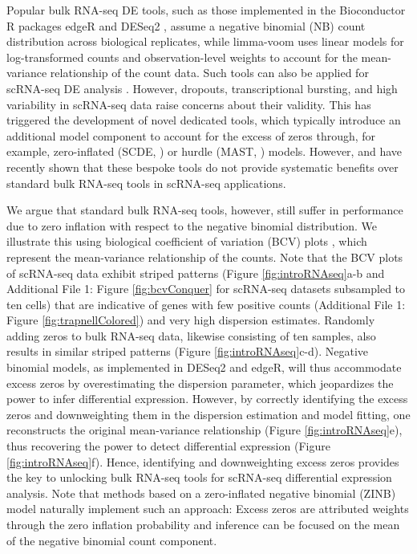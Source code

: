 \documentclass{bmcart}
\newcommand{\RPack}[1]{\textsf{#1}}
\begin{document}
Popular bulk RNA-seq DE tools, such as those implemented in the Bioconductor R packages \RPack{edgeR} \citep{Robinson2010a} and \RPack{DESeq2} \citep{Love2014}, assume a negative binomial (NB) count distribution across biological replicates, while limma-voom \citep{Law2014} uses linear models for log-transformed counts and observation-level weights to account for the mean-variance relationship of the count data. Such tools can also be applied for scRNA-seq DE analysis \citep{Lun2016}. However, dropouts, transcriptional bursting, and high variability in scRNA-seq data raise concerns about their validity. This has triggered the development of novel dedicated tools, which typically introduce an additional model component to account for the excess of zeros through, for example, zero-inflated (\RPack{SCDE}, \citet{Kharchenko2014}) or hurdle (\RPack{MAST}, \citet{Finak2015}) models. However, \citet{Jaakkola2016} and \citet{Soneson2017} have recently shown that these bespoke tools do not provide systematic benefits over standard bulk RNA-seq tools in scRNA-seq applications.

We argue that standard bulk RNA-seq tools, however, still suffer in performance due to zero inflation with respect to the negative binomial distribution. We illustrate this using biological coefficient of variation (BCV) plots \citep{McCarthy2012}, which represent the mean-variance relationship of the counts.
Note that the BCV plots of scRNA-seq data exhibit striped patterns (Figure \ref{fig:introRNAseq}a-b and Additional File 1: Figure \ref{fig:bcvConquer} for scRNA-seq datasets subsampled to ten cells) that are indicative of genes with few positive counts (Additional File 1: Figure \ref{fig:trapnellColored}) and very high dispersion estimates. Randomly adding zeros to bulk RNA-seq data, likewise consisting of ten samples, also results in 
similar striped patterns (Figure \ref{fig:introRNAseq}c-d). Negative binomial models, as implemented in \RPack{DESeq2} and \RPack{edgeR}, will thus accommodate excess zeros by overestimating the dispersion parameter, which jeopardizes the power to infer differential expression. However, by correctly identifying the excess zeros and downweighting them in the dispersion estimation and model fitting, one reconstructs the original mean-variance relationship (Figure \ref{fig:introRNAseq}e), thus recovering the power to detect differential expression (Figure \ref{fig:introRNAseq}f). Hence, identifying and downweighting excess zeros provides the key to unlocking bulk RNA-seq tools for scRNA-seq differential expression analysis. Note that  methods based on a zero-inflated negative binomial (ZINB) model naturally implement such an approach: Excess zeros are attributed weights through the zero inflation probability and inference can be focused on the mean of the negative binomial count component. 
\end{document}
